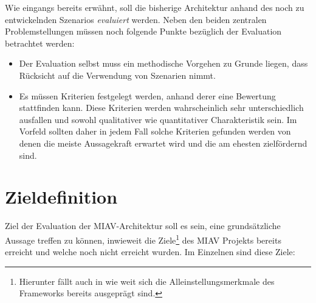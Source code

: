\documentclass[11pt,headsepline,a4paper,bibtotoc,liststotoc,DIV12,BCOR12mm]{scrartcl}
\begin{document}
  Wie eingangs bereits erwähnt, soll die bisherige Architektur anhand des noch zu entwickelnden Szenarios \emph{evaluiert} werden. Neben den beiden zentralen Problemstellungen müssen noch folgende Punkte bezüglich der Evaluation betrachtet werden:

  \begin{itemize}
    \item Der Evaluation selbst muss ein methodische Vorgehen zu Grunde liegen, dass Rücksicht auf die Verwendung von Szenarien nimmt.
    \item Es müssen Kriterien festgelegt werden, anhand derer eine Bewertung stattfinden kann. Diese Kriterien werden wahrscheinlich sehr unterschiedlich ausfallen und sowohl qualitativer wie quantitativer Charakteristik sein. Im Vorfeld sollten daher in jedem Fall solche Kriterien gefunden werden von denen die meiste Aussagekraft erwartet wird und die am ehesten zielfördernd sind.
  \end{itemize}


\section{Zieldefinition} %
\label{sec:zieldefinition}

  Ziel der Evaluation der MIAV-Architektur soll es sein, eine grundsätzliche Aussage treffen zu können, inwieweit die Ziele\footnote{Hierunter fällt auch in wie weit sich die Alleinstellungsmerkmale des Frameworks bereits ausgeprägt sind.} des MIAV Projekts bereits erreicht und welche noch nicht erreicht wurden. Im Einzelnen sind diese Ziele:
  
\end{document}
